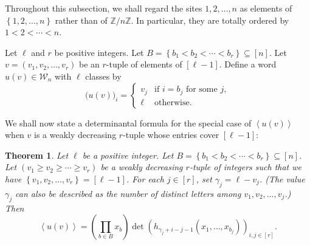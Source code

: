 \documentclass[reqno]{amsart}
\newcommand{\0}{\phantom{c}}
\newcommand{\swt}[1]{\left\langle #1 \right\rangle} %
\newcommand{\std}[1]{\widetilde{#1}} %
\newcommand{\mcW}{\mathcal{W}}
\newcommand{\ZZ}{\mathbb{Z}}
\let\prodnonlimits\prod
\renewcommand{\prod}{\prodnonlimits\limits}
\newcommand{\set}[1]{\left\{ #1 \right\}}
\newcommand{\tup}[1]{\left( #1 \right)}
\newcommand{\ive}[1]{\left[ #1 \right]}
\theoremstyle{plain}
\newtheorem{thm}{Theorem}[section]
\theoremstyle{definition}
\newtheorem{example}[thm]{Example}
\numberwithin{equation}{section}
\begin{document}
\begin{comment}
\begin{example}
\label{ex:NILP_bijection}
Consider $n = 9$, $r = 6$, $\ell = 4$, $v = 332221$, and $B = \set{1,2,4,6,7,9}$.
Therefore, we have the word $u$ in Theorem~\ref{thm:determinant_form} and its near standardization
\begin{align*}
u & = 33{\color{gray} 4}2{\color{gray} 4}22{\color{gray} 4}1,
\\ \std{u} & = 65{\color{gray} 7}4{\color{gray} 7}32{\color{gray} 7}1.
\end{align*}
See Figure~\ref{fig:lattice_path_bijection} for an example of the resulting bijection between an MLQ and disjoint $r$-paths.
\end{example}
\end{comment}

Throughout this subsection, we shall regard the sites $1, 2, \ldots, n$ as elements of $\set{1, 2, \ldots, n}$ rather than of $\ZZ/n\ZZ$.
In particular, they are totally ordered by $1 < 2 < \cdots < n$.

Let $\ell$ and $r$ be positive integers.
Let $B = \set{ b_1 < b_2 < \cdots < b_r} \subseteq \ive{n}$.
Let $v = \tup{v_1, v_2, \ldots, v_r}$ be an $r$-tuple of elements of $\ive{\ell-1}$.
Define a word $u(v) \in \mcW_n$ with $\ell$ classes by
\begin{equation}
\label{eq:weakly_decreasing_construction}
\bigl( u(v) \bigr)_i = \begin{cases}
v_j & \text{if $i = b_j$ for some $j$}, \\
\ell & \text{otherwise}.
\end{cases}
\end{equation}

We shall now state a determinantal formula for the special case of $\swt{u(v)}$
when $v$ is a weakly decreasing $r$-tuple whose entries cover $\ive{\ell-1}$:

\begin{thm}
\label{thm:determinant_form}
Let $\ell$ be a positive integer.
Let $B = \set{ b_1 < b_2 < \cdots < b_r} \subseteq \ive{n}$.
Let $\tup{v_1 \geq v_2 \geq \cdots \geq v_r}$ be a weakly decreasing $r$-tuple of integers such that we have $\set{v_1, v_2, \ldots, v_r} = \ive{\ell-1}$.
For each $j \in \ive{r}$, set $\gamma_j = \ell - v_j$.
(The value $\gamma_j$ can also be described as the number of distinct letters among $v_1, v_2, \dotsc, v_j$.)
Then
\[
\swt{u(v)} = \left(  \prod_{b \in B} x_b \right)  \det \left(  h_{\gamma_j+i-j-1}(x_1,\dotsc,x_{b_j}) \right)_{i, j \in \ive{r}}.
\]
\end{thm}
\end{document}
